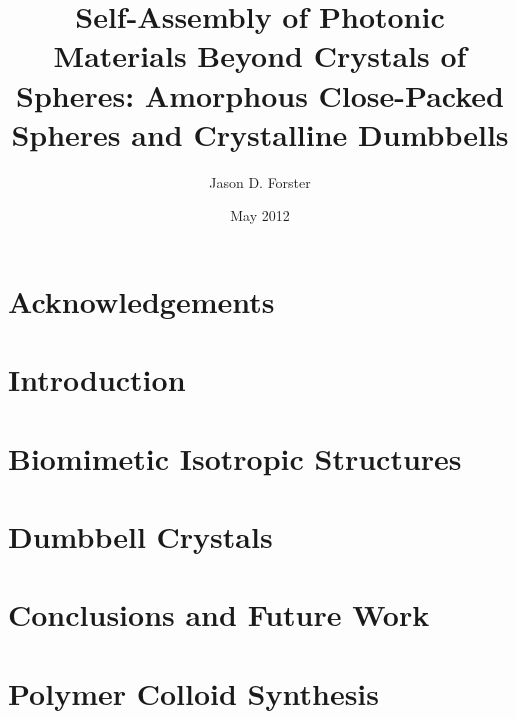 \documentclass[12pt]{yalephd}
\begin{document}
\title{Self-Assembly of Photonic Materials Beyond Crystals of Spheres: Amorphous Close-Packed Spheres and Crystalline Dumbbells}
\author{Jason D. Forster}

\date{May 2012}

\begin{abstract}

\end{abstract}

\maketitle
\makecopyright
\tableofcontents
\listoffigures

\chapter*{Acknowledgements}

\mainmatter

\chapter{Introduction}
\label{chap:introduction}


\chapter{Biomimetic Isotropic Structures}
\label{chap:sphere-isotropic}


\chapter{Dumbbell Crystals}
\label{chap:dumbbell-crystal}

 
\chapter{Conclusions and Future Work}
\label{chap:conclusions}


\appendix

\chapter{Polymer Colloid Synthesis}
\label{chap:synthesis}




\end{document}

